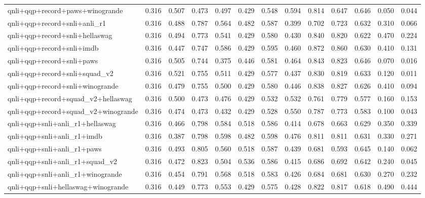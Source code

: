 \begin{table}[t]
\begin{tabular}{lrrrrrrrrrrrr}
    qnli+qqp+record+paws+winogrande & 0.316 & 0.507 & 0.473 & 0.497 & 0.429 & 0.548 & 0.594 & 0.814 & 0.647 & 0.646 & 0.050 & 0.044 \\
    qnli+qqp+record+snli+anli\_r1 & 0.316 & 0.488 & 0.787 & 0.564 & 0.482 & 0.587 & 0.399 & 0.702 & 0.723 & 0.632 & 0.310 & 0.066 \\
    qnli+qqp+record+snli+hellaswag & 0.316 & 0.494 & 0.773 & 0.541 & 0.429 & 0.580 & 0.430 & 0.840 & 0.820 & 0.622 & 0.470 & 0.224 \\
    qnli+qqp+record+snli+imdb & 0.316 & 0.447 & 0.747 & 0.586 & 0.429 & 0.595 & 0.460 & 0.872 & 0.860 & 0.630 & 0.410 & 0.131 \\
    qnli+qqp+record+snli+paws & 0.316 & 0.505 & 0.744 & 0.375 & 0.446 & 0.581 & 0.464 & 0.843 & 0.823 & 0.646 & 0.070 & 0.016 \\
    qnli+qqp+record+snli+squad\_v2 & 0.316 & 0.521 & 0.755 & 0.511 & 0.429 & 0.577 & 0.437 & 0.830 & 0.819 & 0.633 & 0.120 & 0.011 \\
    qnli+qqp+record+snli+winogrande & 0.316 & 0.479 & 0.755 & 0.500 & 0.429 & 0.580 & 0.446 & 0.838 & 0.827 & 0.626 & 0.410 & 0.094 \\
    qnli+qqp+record+squad\_v2+hellaswag & 0.316 & 0.500 & 0.473 & 0.476 & 0.429 & 0.532 & 0.532 & 0.761 & 0.779 & 0.577 & 0.160 & 0.153 \\
    qnli+qqp+record+squad\_v2+winogrande & 0.316 & 0.474 & 0.473 & 0.432 & 0.429 & 0.528 & 0.550 & 0.787 & 0.773 & 0.583 & 0.100 & 0.043 \\
    qnli+qqp+snli+anli\_r1+hellaswag & 0.316 & 0.466 & 0.798 & 0.584 & 0.518 & 0.586 & 0.414 & 0.678 & 0.663 & 0.629 & 0.350 & 0.339 \\
    qnli+qqp+snli+anli\_r1+imdb & 0.316 & 0.387 & 0.798 & 0.598 & 0.482 & 0.598 & 0.476 & 0.811 & 0.811 & 0.631 & 0.330 & 0.271 \\
    qnli+qqp+snli+anli\_r1+paws & 0.316 & 0.493 & 0.805 & 0.560 & 0.518 & 0.587 & 0.439 & 0.681 & 0.593 & 0.645 & 0.140 & 0.062 \\
    qnli+qqp+snli+anli\_r1+squad\_v2 & 0.316 & 0.472 & 0.823 & 0.504 & 0.536 & 0.586 & 0.415 & 0.686 & 0.692 & 0.642 & 0.240 & 0.045 \\
    qnli+qqp+snli+anli\_r1+winogrande & 0.316 & 0.454 & 0.791 & 0.568 & 0.518 & 0.583 & 0.426 & 0.684 & 0.681 & 0.630 & 0.270 & 0.232 \\
    qnli+qqp+snli+hellaswag+winogrande & 0.316 & 0.449 & 0.773 & 0.553 & 0.429 & 0.575 & 0.428 & 0.822 & 0.817 & 0.618 & 0.490 & 0.444 \\

\end{tabular}
\end{table}
